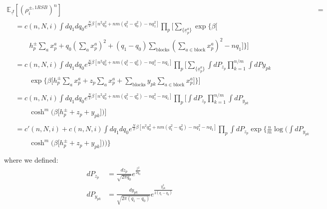 \documentclass{article}
\begin{document}
\begin{align}
\mathbb{E}_{\underline{J}} \left[(\rho_i^{\pm, 1RSB})^n \right] &=&  \\[1ex]
\begin{split}
& = c(n,N,i) \int dq_1 dq_0 e^{\frac{N}{2}\beta\left[n^2 q_0^2 + nm(q_1^2 - q_0^2) -n q_1^2\right]} 
\prod_{p} \biggl[ \sum_{\{\underline{x}^{a}_p\}} \exp\biggl\{\beta \bigl[ \\ 
 & \qquad h_p^{\pm} \sum_{a} x_p^{a} +q_0 \left( \sum_{a} x_p^{a} \right)^2 + (q_1-q_0) \sum_{\text{blocks}} \left( \sum_{a \in \text{block}}x_p^{a}\right)^2  -nq_1 \bigl]  \biggr\}  \biggr] 
\end{split}\\ 
\begin{split}
& = c(n,N,i) \int dq_1 dq_0 e^{\frac{N}{2}\beta\left[n^2 q_0^2 + nm(q_1^2 - q_0^2) -n q_1^2 -n q_1\right]} 
\prod_{p} \biggl[ \sum_{\{\underline{x}^{a}_p\}} \int dP_{z_p} \prod_{k=1}^{n/m} \int dP{y_{pk}} \\ 
 &  \qquad  \exp\biggl\{\beta \bigl[h_p^{\pm} \sum_{a} x_p^{a} +  z_p \sum_{a}x_p^{a} + \sum_{\text{blocks}}  y_{pk} \sum_{a \in \text{block}}x_p^{a}\bigl]  \biggr\}  \biggr] 
\end{split}\\ 
\begin{split}
& = c(n,N,i) \int dq_1 dq_0 e^{\frac{N}{2}\beta\left[n^2 q_0^2 + nm(q_1^2 - q_0^2) -n q_1^2 -n q_1\right]} 
\prod_{p} \biggl[ \int dP_{z_p}  \prod_{k=1}^{n/m} \int dP_{y_{pk}}\\ 
 &  \qquad  \cosh^m\biggl(\beta \bigl[h_p^{\pm}+  z_p +y_{pk}\bigl]  \biggr)  \biggr]
\end{split}\\ 
\begin{split}
& = c'(n,N,i) + c(n,N,i) \int dq_1 dq_0 e^{\frac{N}{2}\beta\left[n^2 q_0^2 + nm(q_1^2 - q_0^2) -n q_1^2 -n q_1\right]} 
\prod_{p} \int dP_{z_p}  \exp \biggl\{ \frac{n}{m} \log \biggl( \int dP_{y_{pk}}\\ 
 &  \qquad  \cosh^m\biggl(\beta \bigl[h_p^{\pm}+ z_p + y_{pk}\bigl]  \biggr)  \biggr) \biggr\}
\end{split}\\ 
\end{align}
where we defined:
\begin{align}
    dP_{z_p} & = \frac{dz_p}{\sqrt{2\pi q_0}}e^{\frac{z^2}{2q_0}}\\
    dP_{y_{pk}} & = \frac{dy_{pk}}{\sqrt{2\pi (q_1-q_0)}}e^{\frac{y_{pk}^2}{2 (q_i-q_0)}}
\end{align}
\end{document}
